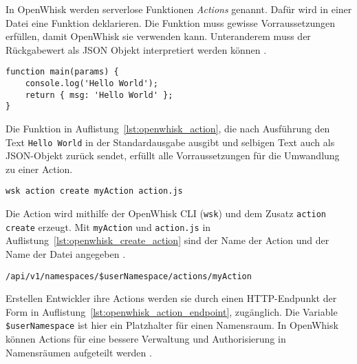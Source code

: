 In OpenWhisk werden serverlose Funktionen \emph{Actions} genannt.
Dafür wird in einer Datei eine Funktion deklarieren.
Die Funktion muss gewisse Vorraussetzungen erfüllen,
damit OpenWhisk sie verwenden kann.
Unteranderem muss der Rückgabewert als JSON Objekt
interpretiert werden können \cite{OpenWhiskGithubActions}.\\

\begin{lstlisting}[caption={Hello World JS Funktion. In Anlehnung an \cite{OpenWhiskGithub} \cite{OpenWhiskGithubActions}}, label={lst:openwhisk_action}]
function main(params) {
    console.log('Hello World');
    return { msg: 'Hello World' };
}
\end{lstlisting}

Die Funktion in Auflistung~\ref{lst:openwhisk_action},
die nach Ausführung den Text \texttt{Hello World}
in der Standardausgabe ausgibt und selbigen Text
auch als JSON-Objekt zurück sendet, erfüllt alle Vorraussetzungen
für die Umwandlung zu einer Action.\\

\begin{lstlisting}[caption=Erstellen einer Action \cite{OpenWhiskGithub}, label={lst:openwhisk_create_action}]
wsk action create myAction action.js
\end{lstlisting}

Die Action wird mithilfe der OpenWhisk CLI (\texttt{wsk})
und dem Zusatz \texttt{action create} erzeugt.
Mit \texttt{myAction} und \texttt{action.js} 
in Auflistung~\ref{lst:openwhisk_create_action}
sind der Name der Action und der Name der Datei angegeben
\cite{OpenWhiskGithub}.\\

\begin{lstlisting}[caption=Action Endpunkt \cite{OpenWhiskGithub}, label={lst:openwhisk_action_endpoint}]
/api/v1/namespaces/$userNamespace/actions/myAction
\end{lstlisting}

Erstellen Entwickler ihre Actions werden sie durch
einen HTTP-Endpunkt der Form in Auflistung~\ref{lst:openwhisk_action_endpoint},
zugänglich.
Die Variable \texttt{\$userNamespace} ist hier ein
Platzhalter für einen Namensraum.
In OpenWhisk können Actions für eine bessere
Verwaltung und Authorisierung in Namensräumen aufgeteilt werden
\cite{OpenWhiskGithub}.



